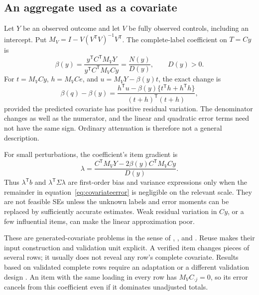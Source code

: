 \subsection{An aggregate used as a covariate}
Let $Y$ be an observed outcome and let $V$ be fully observed controls,
including an intercept. Put $M_V=I-V(V^{\mathsf T}V)^{-1}V^{\mathsf T}$.
The complete-label coefficient on $T=Cy$ is
\begin{equation}\label{eq:truecovariate}
\beta(y)=\frac{y^{\mathsf T}C^{\mathsf T}M_VY}
                    {y^{\mathsf T}C^{\mathsf T}M_VCy}
        =\frac{N(y)}{D(y)},\qquad D(y)>0.
\end{equation}
For $t=M_VCy$, $h=M_VCe$, and $u=M_VY-\beta(y)t$, the exact change is
\begin{equation}\label{eq:covariateerror}
\beta(q)-\beta(y)=
\frac{h^{\mathsf T}u-\beta(y)
          \{t^{\mathsf T}h+h^{\mathsf T}h\}}
     {(t+h)^{\mathsf T}(t+h)},
\end{equation}
provided the predicted covariate has positive residual variation.
The denominator changes as well as the numerator, and the linear and
quadratic error terms need not have the same sign. Ordinary attenuation is
therefore not a general description.

For small perturbations, the coefficient's item gradient is
\begin{equation}\label{eq:regressiongradient}
\lambda=\frac{C^{\mathsf T}M_VY-2\beta(y)C^{\mathsf T}M_VCy}{D(y)}.
\end{equation}
Thus $\lambda^{\mathsf T}b$ and $\lambda^{\mathsf T}\Sigma\lambda$ are
first-order bias and variance expressions only when the remainder in
equation~\eqref{eq:covariateerror} is negligible on the relevant scale.
They are not feasible SEs unless the unknown labels and error moments can
be replaced by sufficiently accurate estimates. Weak residual variation in
$Cy$, or a few influential items, can make the linear approximation poor.

These are generated-covariate problems in the sense of
\citet{fong2021predictions}, \citet{battaglia2025generated}, and
\citet{christensen2026guide}. Reuse makes their input construction and
validation unit explicit. A verified item changes pieces of several rows;
it usually does not reveal any row's complete covariate. Results based on
validated complete rows require an adaptation or a different validation
design \citep{kluger2025imputed}. An item with the same loading in every
row has $M_VC_{\cdot j}=0$, so its error cancels from this coefficient even
if it dominates unadjusted totals.

